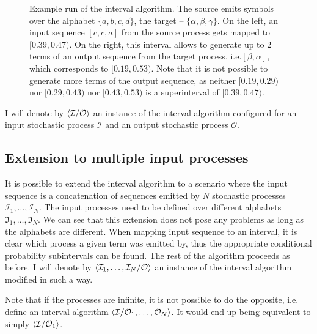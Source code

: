 \documentclass[draft]{IIBproject}
\makeatletter
\DeclarePairedDelimiter{\angled}{\langle}{\rangle}
\DeclareRobustCommand*{\ie}{i.e.\@\xspace}
\DeclareRobustCommand{\intervalAlgorithm}[2]{$\angled{\mathcal{#1} / \mathcal{#2}}$\@\xspace}
\newcommand{\interval}[6] {
	\draw[#6] [i] (#1,#2+#4*#3) -- (#1,#2+#5*#3);
}
\newcommand{\intervalBottomLabel}[7] {
	\interval{#1}{#2}{#3}{#4}{#5}{#6}
	\node[#7] at (#1,#2+#4*#3) {\footnotesize #4};
}
\newcommand{\intervalBothLabels}[7] {
	\intervalBottomLabel{#1}{#2}{#3}{#4}{#5}{#6}{#7}
	\node[#7] at (#1,#2+#5*#3) {\footnotesize #5};
}
\makeatother
\begin{document}
\begin{figure}[h]

	\caption{\label{fig:interval_algorithm}Example run of the interval algorithm. The source emits symbols over the alphabet $\{a,b,c,d\}$, the target -- $\{\alpha,\beta,\gamma\}$. On the left, an input sequence $[c,c,a]$ from the source process gets mapped to $[0.39,0.47)$. On the right, this interval allows to generate up to 2 terms of an output sequence from the target process, \ie $[\beta,\alpha]$, which corresponds to $[0.19,0.53)$. Note that it is not possible to generate more terms of the output sequence, as neither $[0.19,0.29)$ nor $[0.29,0.43)$ nor $[0.43,0.53)$ is a superinterval of $[0.39,0.47)$.}

\end{figure}

I will denote by \intervalAlgorithm{I}{O} an instance of the interval algorithm configured for an input stochastic process $\mathcal I$ and an output stochastic process $\mathcal O$.

\subsection{Extension to multiple input processes}

It is possible to extend the interval algorithm to a scenario where the input sequence is a concatenation of sequences emitted by $N$ stochastic processes $\mathcal I_1, \dots, \mathcal I_N$. The input processes need to be defined over different alphabets $\mathfrak I_1, \dots, \mathfrak I_N$. We can see that this extension does not pose any problems as long as the alphabets are different. When mapping input sequence to an interval, it is clear which process a given term was emitted by, thus the appropriate conditional probability subintervals can be found. The rest of the algorithm proceeds as before. I will denote by $\angled{\mathcal I_1, \dots, \mathcal I_N / \mathcal O}$ an instance of the interval algorithm modified in such a way.

Note that if the processes are infinite, it is not possible to do the opposite, \ie define an interval algorithm $\angled{\mathcal I / \mathcal O_1, \dots, \mathcal O_N}$. It would end up being equivalent to simply $\angled{\mathcal I / \mathcal O_1}$.
\end{document}
